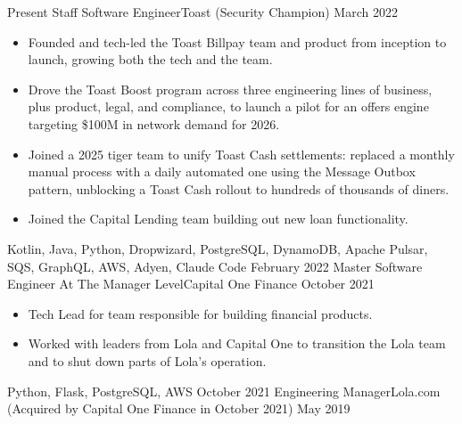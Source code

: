 %
%
%
\begin{experiences}
  \experience
  {Present}  {Staff Software Engineer}{Toast {\footnotesize (Security Champion)}}
  {March 2022}   {
                      \begin{itemize}
                        \item Founded and tech-led the Toast Billpay team and product from inception to launch, growing both the tech and the team.
                        \item Drove the Toast Boost program across three engineering lines of business, plus product, legal, and compliance, to launch a pilot for an offers engine targeting \$100M in network demand for 2026.
                        \item Joined a 2025 tiger team to unify Toast Cash settlements: replaced a monthly manual process with a daily automated one using the Message Outbox pattern, unblocking a Toast Cash rollout to hundreds of thousands of diners.
                        \item Joined the Capital Lending team building out new loan functionality.
                      \end{itemize}
                  }
                  {Kotlin, Java, Python, Dropwizard, PostgreSQL, DynamoDB, Apache Pulsar, SQS, GraphQL, AWS, Adyen, Claude Code}
  \emptySeparator
  \experience
  {February 2022}  {Master Software Engineer At The Manager Level}{Capital One Finance}
  {October 2021}   {
                      \begin{itemize}
                        \item Tech Lead for team responsible for building financial products.
                        \item Worked with leaders from Lola and Capital One to transition the Lola team and to shut down parts of Lola's operation.
                      \end{itemize}
                  }
                  {Python, Flask, PostgreSQL, AWS}
  \emptySeparator
  \experience
  {October 2021}  {Engineering Manager}{Lola.com {\footnotesize (Acquired by Capital One Finance in October 2021)}}
  {May 2019}   {
                      \begin{itemize}

\end{itemize}}
\end{experiences}
